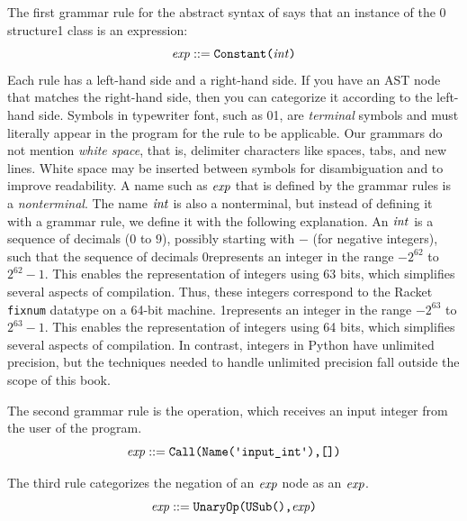 \documentclass[7x10]{TimesAPriori_MIT}%
\def\racketEd{0}
\def\pythonEd{1}
\def\edition{1}
\newcommand{\racket}[1]{{\if\edition\racketEd{#1}\fi}}
\newcommand{\pythonColor}[0]{}
\newcommand{\python}[1]{{\if\edition\pythonEd\pythonColor #1\fi}}
\numberwithin{theorem}{chapter}
\numberwithin{definition}{chapter}
\numberwithin{equation}{chapter}
\begin{document}
The first grammar rule for the abstract syntax of \LangInt{} says that an
instance of the \racket{ structure}\python{ class} is an expression:
\begin{equation}
\mathit{exp} ::= {\texttt{Constant}\texttt{(}\mathit{int}\texttt{)}}  \label{eq:arith-int}
\end{equation}
%
Each rule has a left-hand side and a right-hand side.
If you have an AST node that matches the
right-hand side, then you can categorize it according to the
left-hand side.
%
Symbols in typewriter font, such as \racket{}\python{},
are \emph{terminal} symbols and must literally appear in the program for the
rule to be applicable.
%
Our grammars do not mention \emph{white space}, that is, delimiter
characters like spaces, tabs, and new lines. White space may be
inserted between symbols for disambiguation and to improve
readability.  
%
A name such as $\mathit{exp}$ that is defined by the grammar rules is a
\emph{nonterminal}.  
%
The name $\mathit{int}$ is also a nonterminal, but instead of defining it with
a grammar rule, we define it with the following explanation.  An
$\mathit{int}$ is a sequence of decimals ($0$ to $9$), possibly starting with
$-$ (for negative integers), such that the sequence of decimals
%
\racket{represents an integer in the range $-2^{62}$ to $2^{62}-1$.  This
enables the representation of integers using 63 bits, which simplifies
several aspects of compilation.
%
Thus, these integers correspond to the Racket \texttt{fixnum}
datatype on a 64-bit machine.}
%
\python{represents an integer in the range $-2^{63}$ to $2^{63}-1$.  This
enables the representation of integers using 64 bits, which simplifies
several aspects of compilation. In contrast, integers in Python have
unlimited precision, but the techniques needed to handle unlimited
precision fall outside the scope of this book.}

The second grammar rule is the \READOP{} operation, which receives an
input integer from the user of the program.
\begin{equation}
  \Exp ::= \READ{} \label{eq:arith-read}
\end{equation}

The third rule categorizes the negation of an $\mathit{exp}$ node as an
$\mathit{exp}$.
\begin{equation}
  \mathit{exp} ::= {\texttt{UnaryOp(USub(),} \mathit{exp}\texttt{)}}  \label{eq:arith-neg}
\end{equation}
\end{document}

